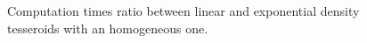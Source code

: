 \documentclass[extra, referee]{gji}
\begin{document}
\begin{figure}
\centering
{}
\caption{
    Computation times ratio between linear and exponential density tesseroids with an
    homogeneous one.
}
\label{fig:computation-times}
\end{figure}
\end{document}
